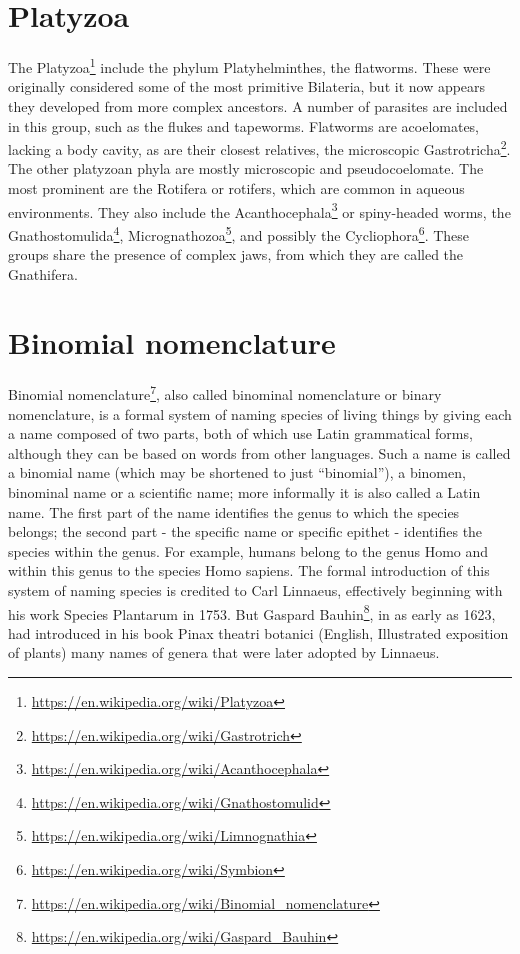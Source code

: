 \documentclass[]{book}
\let\rmarkdownfootnote\footnote%
\def\footnote{\protect\rmarkdownfootnote}
\renewcommand{\href}[2]{#2\footnote{\url{#1}}}
\begin{document}
\hypertarget{platyzoa}{%
\section{Platyzoa}\label{platyzoa}}

The \href{https://en.wikipedia.org/wiki/Platyzoa}{Platyzoa} include the phylum Platyhelminthes, the flatworms. These were originally considered some of the most primitive Bilateria, but it now appears they developed from more complex ancestors. A number of parasites are included in this group, such as the flukes and tapeworms. Flatworms are acoelomates, lacking a body cavity, as are their closest relatives, the microscopic \href{https://en.wikipedia.org/wiki/Gastrotrich}{Gastrotricha}. The other platyzoan phyla are mostly microscopic and pseudocoelomate. The most prominent are the Rotifera or rotifers, which are common in aqueous environments. They also include the \href{https://en.wikipedia.org/wiki/Acanthocephala}{Acanthocephala} or spiny-headed worms, the \href{https://en.wikipedia.org/wiki/Gnathostomulid}{Gnathostomulida}, \href{https://en.wikipedia.org/wiki/Limnognathia}{Micrognathozoa}, and possibly the \href{https://en.wikipedia.org/wiki/Symbion}{Cycliophora}. These groups share the presence of complex jaws, from which they are called the Gnathifera. 

\hypertarget{binomial-nomenclature}{%
\section{Binomial nomenclature}\label{binomial-nomenclature}}

\href{https://en.wikipedia.org/wiki/Binomial_nomenclature}{Binomial nomenclature}, also called binominal nomenclature or binary nomenclature, is a formal system of naming species of living things by giving each a name composed of two parts, both of which use Latin grammatical forms, although they can be based on words from other languages. Such a name is called a binomial name (which may be shortened to just ``binomial''), a binomen, binominal name or a scientific name; more informally it is also called a Latin name. The first part of the name identifies the genus to which the species belongs; the second part - the specific name or specific epithet - identifies the species within the genus. For example, humans belong to the genus Homo and within this genus to the species Homo sapiens. The formal introduction of this system of naming species is credited to Carl Linnaeus, effectively beginning with his work Species Plantarum in 1753. But \href{https://en.wikipedia.org/wiki/Gaspard_Bauhin}{Gaspard Bauhin}, in as early as 1623, had introduced in his book Pinax theatri botanici (English, Illustrated exposition of plants) many names of genera that were later adopted by Linnaeus.
\end{document}
